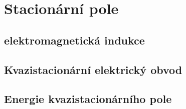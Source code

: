 \graphicspath{{../src/FYZ/img/}}
\setchaptertoc
\chapter{Stacionární pole}\label{fyz:IIIchapIV}
  \section{elektromagnetická indukce}\label{fyz:IIIchapIVsecI}
  \section{Kvazistacionární elektrický obvod}\label{fyz:IIIchapIVsecII}
  \section{Energie kvazistacionárního pole}\label{fyz:IIIchapIVsecIII}

